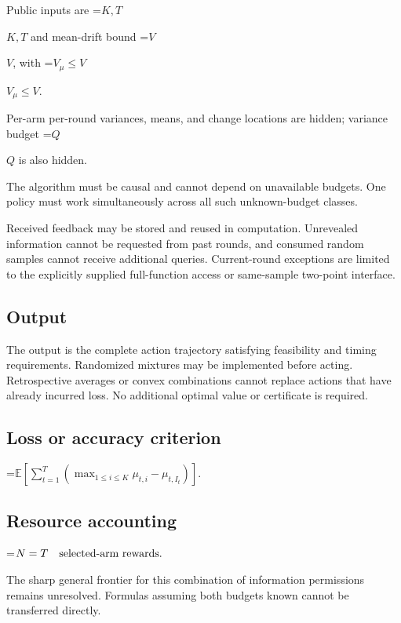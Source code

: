\documentclass[10pt,a4paper]{article}
\newcommand{\AtlasMath}[1]{\par\begingroup\centering\setbox0=\hbox{$\displaystyle #1$}\ifdim\wd0>1.4\linewidth\typeout{ATLAS WIDE FORMULA: \the\wd0}\fi\ifdim\wd0>\linewidth\resizebox{\linewidth}{!}{\box0}\else\box0\fi\par\endgroup}
\newcommand{\AtlasInlineMath}[1]{\begingroup\setbox0=\hbox{$#1$}\ifdim\wd0>.4\linewidth\endgroup\AtlasMath{#1}\else\endgroup$#1$\fi}
\begin{document}
Public inputs are \AtlasInlineMath{K,T} and mean-drift bound \AtlasInlineMath{V}, with \AtlasInlineMath{V_\mu\le V}.



Per-arm per-round variances, means, and change locations are hidden; variance budget \AtlasInlineMath{Q} is also hidden.



The algorithm must be causal and cannot depend on unavailable budgets. One policy must work simultaneously across all such unknown-budget classes.



Received feedback may be stored and reused in computation. Unrevealed information cannot be requested from past rounds, and consumed random samples cannot receive additional queries. Current-round exceptions are limited to the explicitly supplied full-function access or same-sample two-point interface.



\subsection{Output}


The output is the complete action trajectory satisfying feasibility and timing requirements. Randomized mixtures may be implemented before acting. Retrospective averages or convex combinations cannot replace actions that have already incurred loss. No additional optimal value or certificate is required.



\subsection{Loss or accuracy criterion}



\AtlasMath{\mathbb{E}\!\left[\sum_{t=1}^{T}\left(\max_{1\le i\le K}\mu_{t,i}-\mu_{t,I_t}\right)\right].}




\subsection{Resource accounting}



\AtlasMath{N=T\quad\text{\text{selected-arm rewards}}.}




The sharp general frontier for this combination of information permissions remains unresolved. Formulas assuming both budgets known cannot be transferred directly.
\end{document}
